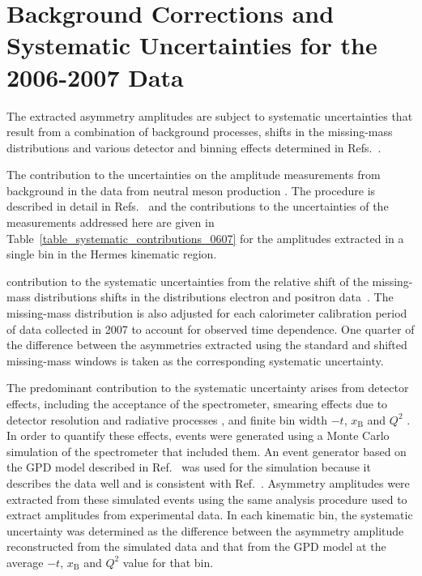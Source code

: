 \section{Background Corrections and Systematic Uncertainties for the
  2006-2007 Data}
The extracted asymmetry amplitudes are subject to systematic uncertainties that
result from a combination of background processes, 
shifts in the missing-mass distributions and various detector and binning
effects determined in  Refs.~\cite{Air08,Air09}.

The contribution to the uncertainties on the amplitude measurements
 from background in the data from neutral meson
production . The procedure  is described in detail in
Refs.~\cite{Air08,Air09} and the contributions to the uncertainties of
the measurements addressed here are given in
Table~\ref{table_systematic_contributions_0607} for the amplitudes
extracted in a single bin in the H{\sc ermes} kinematic
region. 

 contribution to the systematic uncertainties from the relative shift of the
missing-mass distributions  shifts in the
distributions  electron and positron data~\cite{Zei09,Bur10}. The
missing-mass distribution is also adjusted for each calorimeter calibration period of data
collected in 2007 to account for  observed time dependence. One
quarter of the difference between the asymmetries extracted using the standard
and shifted missing-mass windows is taken as the corresponding systematic
uncertainty. 

The predominant contribution to the systematic uncertainty arises from detector
effects, including the acceptance of the spectrometer, smearing
effects due to detector resolution and radiative processes , and
 finite bin width  $-t$, $x_{\textrm{B}}$ and $Q^{2}$ . In order to quantify
these effects, events were generated using a Monte Carlo simulation of
the spectrometer that included them. An event
generator based on the GPD model described in Ref.~\cite{Guz06} was
used for the simulation because it describes the data well and is
consistent with Ref.~\cite{Air09}. Asymmetry amplitudes were extracted
from these simulated events using the same analysis procedure used to
extract amplitudes from experimental data. In each kinematic bin, the
systematic uncertainty was determined as the difference between the asymmetry amplitude reconstructed from the simulated data and that
 from the GPD model at the average $-t$, $x_{\textrm{B}}$ and
$Q^{2}$ value for that bin.

